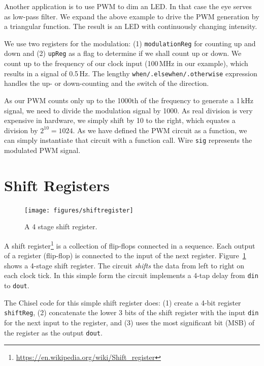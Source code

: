 \documentclass[%
    10pt,
    headinclude, footexclude,
    openright, %
    notitlepage,
    cleardoubleempty,
    headsepline,
    pointlessnumbers,
    bibtotoc, idxtotoc,
    ]{scrbook}
\newcommand{\code}[1]{{\small{\texttt{#1}}}}
\newcommand{\myref}[2]{\href{#1}{#2}}
\renewcommand{\myref}[2]{{#2}{\footnote{\url{#1}}}}
\begin{document}
Another application is to use PWM to dim an LED. In that case the eye serves as low-pass
filter. We expand the above example to drive the PWM generation by a triangular function.
The result is an LED with continuously changing intensity.


We use two registers for the modulation: (1) \code{modulationReg} for counting up and down
and (2) \code{upReg} as a flag to determine if we shall count up or down. We count up
to the frequency of our clock input (100\,MHz in our example), which results in a signal
of 0.5\,Hz. The lengthy \code{when/.elsewhen/.otherwise} expression handles the up- or
down-counting and the switch of the direction.

As our PWM counts only up to the 1000th of the frequency to generate a 1\,kHz signal,
we need to divide the modulation signal by 1000. As real division is very expensive in hardware,
we simply shift by 10 to the right, which equates a division by $2^{10} = 1024$.
As we have defined the PWM circuit as a function, we can simply instantiate that circuit
with a function call. Wire \code{sig} represents the modulated PWM signal.

\section{Shift Registers}

\begin{figure}
  \centering
  \texttt{[image: figures/shiftregister]}
  \caption{A 4 stage shift register.}
  \label{fig:shiftregister}
\end{figure}


A \myref{https://en.wikipedia.org/wiki/Shift_register}{shift register} is a collection of flip-flops
connected in a sequence. Each output of a register (flip-flop) is connected to the input of the
next register. Figure~\ref{fig:shiftregister} shows a 4-stage shift register.
The circuit \emph{shifts} the data from left to right on each clock tick. In this simple form the
circuit implements a 4-tap delay from \code{din} to \code{dout}.

The Chisel code for this simple shift register does: (1) create a 4-bit register \code{shiftReg},
(2) concatenate the lower 3 bits of the shift register with the input \code{din} for the next
input to the register, and (3) uses the most significant bit (MSB) of the register as the output \code{dout}.

\end{document}
